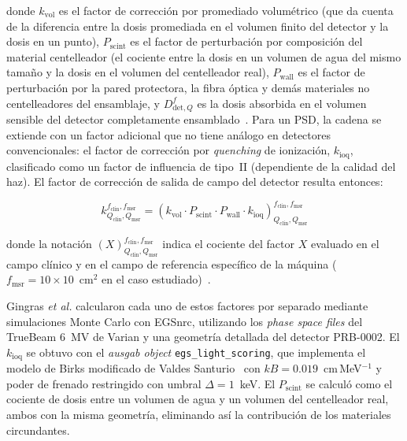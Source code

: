 \documentclass[11pt,a4paper]{article}
\begin{document}
\noindent donde $k_{\mathrm{vol}}$ es el factor de corrección por promediado volumétrico (que da cuenta de la diferencia entre la dosis promediada en el volumen finito del detector y la dosis en un punto), $P_{\mathrm{scint}}$ es el factor de perturbación por composición del material centelleador (el cociente entre la dosis en un volumen de agua del mismo tamaño y la dosis en el volumen del centelleador real), $P_{\mathrm{wall}}$ es el factor de perturbación por la pared protectora, la fibra óptica y demás materiales no centelleadores del ensamblaje, y $D^{f}_{\mathrm{det},Q}$ es la dosis absorbida en el volumen sensible del detector completamente ensamblado~\cite{gingras2025}. Para un PSD, la cadena se extiende con un factor adicional que no tiene análogo en detectores convencionales: el factor de corrección por \textit{quenching} de ionización, $k_{\mathrm{ioq}}$, clasificado como un factor de influencia de tipo~II (dependiente de la calidad del haz). El factor de corrección de salida de campo del detector resulta entonces:

\begin{equation}
k^{f_{\mathrm{clin}},f_{\mathrm{msr}}}_{Q_{\mathrm{clin}},Q_{\mathrm{msr}}} = \left(k_{\mathrm{vol}} \cdot P_{\mathrm{scint}} \cdot P_{\mathrm{wall}} \cdot k_{\mathrm{ioq}}\right)^{f_{\mathrm{clin}},f_{\mathrm{msr}}}_{Q_{\mathrm{clin}},Q_{\mathrm{msr}}}
\label{eq:kfclin}
\end{equation}

\noindent donde la notación $(X)^{f_{\mathrm{clin}},f_{\mathrm{msr}}}_{Q_{\mathrm{clin}},Q_{\mathrm{msr}}}$ indica el cociente del factor $X$ evaluado en el campo clínico y en el campo de referencia específico de la máquina ($f_{\mathrm{msr}} = 10 \times 10$~cm$^{2}$ en el caso estudiado)~\cite{gingras2025}.

Gingras \textit{et al.} calcularon cada uno de estos factores por separado mediante simulaciones Monte Carlo con EGSnrc, utilizando los \textit{phase space files} del TrueBeam 6~MV de Varian y una geometría detallada del detector PRB-0002. El $k_{\mathrm{ioq}}$ se obtuvo con el \textit{ausgab object} \texttt{egs\_light\_scoring}, que implementa el modelo de Birks modificado de Valdes Santurio~\cite{santurio2020} con $kB = 0{.}019$~cm\,MeV$^{-1}$ y poder de frenado restringido con umbral $\Delta = 1$~keV. El $P_{\mathrm{scint}}$ se calculó como el cociente de dosis entre un volumen de agua y un volumen del centelleador real, ambos con la misma geometría, eliminando así la contribución de los materiales circundantes.
\end{document}
